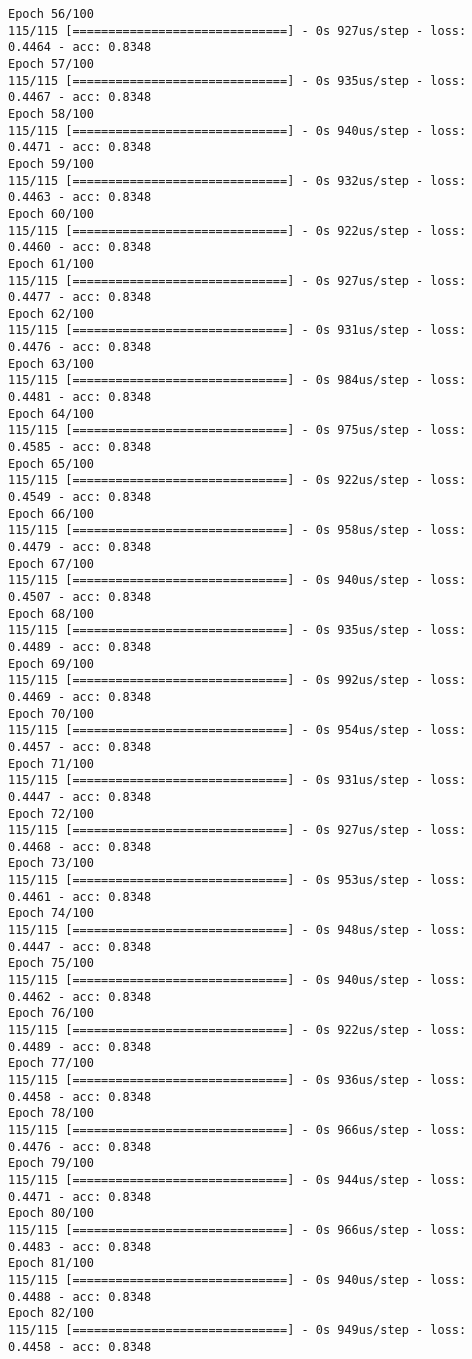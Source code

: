 \documentclass[11pt]{article}
\begin{document}
\begin{Verbatim}[commandchars=\\\{\}]
Epoch 56/100
115/115 [==============================] - 0s 927us/step - loss: 0.4464 - acc: 0.8348
Epoch 57/100
115/115 [==============================] - 0s 935us/step - loss: 0.4467 - acc: 0.8348
Epoch 58/100
115/115 [==============================] - 0s 940us/step - loss: 0.4471 - acc: 0.8348
Epoch 59/100
115/115 [==============================] - 0s 932us/step - loss: 0.4463 - acc: 0.8348
Epoch 60/100
115/115 [==============================] - 0s 922us/step - loss: 0.4460 - acc: 0.8348
Epoch 61/100
115/115 [==============================] - 0s 927us/step - loss: 0.4477 - acc: 0.8348
Epoch 62/100
115/115 [==============================] - 0s 931us/step - loss: 0.4476 - acc: 0.8348
Epoch 63/100
115/115 [==============================] - 0s 984us/step - loss: 0.4481 - acc: 0.8348
Epoch 64/100
115/115 [==============================] - 0s 975us/step - loss: 0.4585 - acc: 0.8348
Epoch 65/100
115/115 [==============================] - 0s 922us/step - loss: 0.4549 - acc: 0.8348
Epoch 66/100
115/115 [==============================] - 0s 958us/step - loss: 0.4479 - acc: 0.8348
Epoch 67/100
115/115 [==============================] - 0s 940us/step - loss: 0.4507 - acc: 0.8348
Epoch 68/100
115/115 [==============================] - 0s 935us/step - loss: 0.4489 - acc: 0.8348
Epoch 69/100
115/115 [==============================] - 0s 992us/step - loss: 0.4469 - acc: 0.8348
Epoch 70/100
115/115 [==============================] - 0s 954us/step - loss: 0.4457 - acc: 0.8348
Epoch 71/100
115/115 [==============================] - 0s 931us/step - loss: 0.4447 - acc: 0.8348
Epoch 72/100
115/115 [==============================] - 0s 927us/step - loss: 0.4468 - acc: 0.8348
Epoch 73/100
115/115 [==============================] - 0s 953us/step - loss: 0.4461 - acc: 0.8348
Epoch 74/100
115/115 [==============================] - 0s 948us/step - loss: 0.4447 - acc: 0.8348
Epoch 75/100
115/115 [==============================] - 0s 940us/step - loss: 0.4462 - acc: 0.8348
Epoch 76/100
115/115 [==============================] - 0s 922us/step - loss: 0.4489 - acc: 0.8348
Epoch 77/100
115/115 [==============================] - 0s 936us/step - loss: 0.4458 - acc: 0.8348
Epoch 78/100
115/115 [==============================] - 0s 966us/step - loss: 0.4476 - acc: 0.8348
Epoch 79/100
115/115 [==============================] - 0s 944us/step - loss: 0.4471 - acc: 0.8348
Epoch 80/100
115/115 [==============================] - 0s 966us/step - loss: 0.4483 - acc: 0.8348
Epoch 81/100
115/115 [==============================] - 0s 940us/step - loss: 0.4488 - acc: 0.8348
Epoch 82/100
115/115 [==============================] - 0s 949us/step - loss: 0.4458 - acc: 0.8348

\end{Verbatim}
\end{document}
